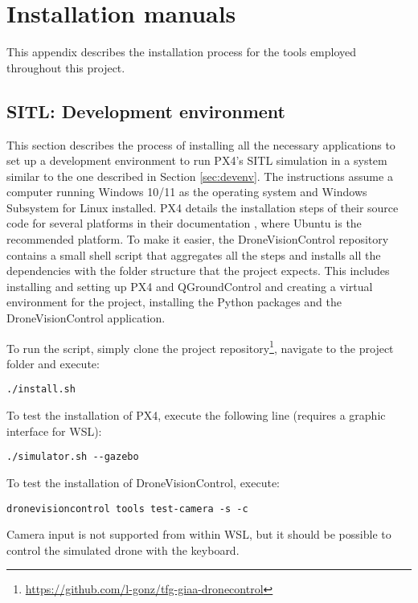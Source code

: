 \chapter{Installation manuals}

This appendix describes the installation process for the tools employed throughout this project. 


\section{SITL: Development environment}
\label{app:install-dev-env}

This section describes the process of installing all the necessary applications to set up a development environment to run PX4's SITL simulation in a system similar to the one described in Section \ref{sec:devenv}.
The instructions assume a computer running Windows 10/11 as the operating system and Windows Subsystem for Linux installed.
PX4 details the installation steps of their source code for several platforms in their documentation \cite{install-px4}, where Ubuntu is the recommended platform.
To make it easier, the DroneVisionControl repository contains a small shell script that aggregates all the steps and installs all the dependencies with the folder structure that the project expects.
This includes installing and setting up PX4 and QGroundControl and creating a virtual environment for the project, installing the Python packages and the DroneVisionControl application.

To run the script, simply clone the project repository\footnote{\url{https://github.com/l-gonz/tfg-giaa-dronecontrol}}, navigate to the project folder and execute:
\begin{verbatim}
./install.sh
\end{verbatim}

To test the installation of PX4, execute the following line (requires a graphic interface for WSL):
\begin{verbatim}
./simulator.sh --gazebo
\end{verbatim}

To test the installation of DroneVisionControl, execute:
\begin{verbatim}
dronevisioncontrol tools test-camera -s -c
\end{verbatim}
Camera input is not supported from within WSL, but it should be possible to control the simulated drone with the keyboard.

